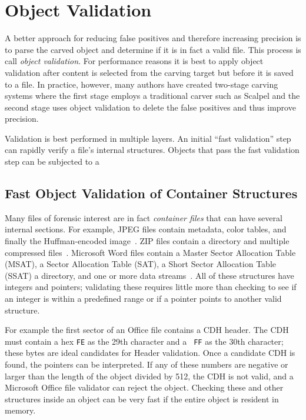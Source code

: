 \documentclass[11pt,letter]{article}
\begin{document}
\section{Object Validation}

A better approach for reducing false positives and therefore
increasing precision is to parse the carved
object and determine if it is in fact a valid file. This process is
call \emph{object validation}. For performance reasons it is best
to apply object validation after
content is selected from the carving target but before it is saved to
a file. In practice, however, many authors have created two-stage
carving systems where the first stage employs a traditional carver
such as Scalpel and the second stage uses object validation to delete
the false positives and thus improve precision. 

Validation is best performed in multiple layers. An initial ``fast
validation'' step can rapidly verify a file's internal
structures. Objects that pass the fast validation step can be
subjected to a 

\subsection{Fast Object Validation of Container Structures}


Many files of forensic interest are in fact \emph{container files}
that can have several internal sections. For example, JPEG files 
contain metadata, color tables, and finally the Huffman-encoded image~\cite{jpeg-format}.
ZIP files contain a directory and multiple compressed files~\cite{zip-format}. Microsoft
Word files contain a Master Sector Allocation Table (MSAT), a Sector
Allocation Table (SAT), a Short Sector Allocation Table (SSAT) a
directory, and one or more data streams~\cite{msole-format}. All of
these structures have integers
and pointers; validating these requires little more than checking to
see if an integer is within a predefined range or if a pointer points
to another valid structure. 

For example the first sector of an Office file contains a CDH header.
The CDH must contain a hex {\tt FE} as the 29th character and a {\tt
FF} as the 30th character; these bytes are ideal candidates for Header 
validation. Once a candidate CDH is found, the pointers can be
interpreted. If any of these numbers are negative or larger than the
length of the object divided by 512, the CDH is not valid, and a
Microsoft Office file validator can reject the object. Checking these
and other structures inside an object can be very fast if the entire
object is resident in memory.
\end{document}

